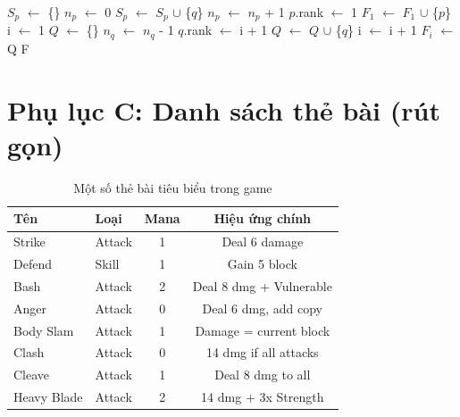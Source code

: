 \begin{algorithm}[H]
\caption{Fast Non-Dominated Sort}
\begin{algorithmic}[1]
    \State $S_p$ $\gets$ \{\} 
    \State $n_p$ $\gets$ 0 
            \State $S_p$ $\gets$ $S_p$ $\cup$ \{$q$\}
            \State $n_p$ $\gets$ $n_p$ + 1
        \EndIf
    \EndFor
        \State $p$.rank $\gets$ 1
        \State $F_1$ $\gets$ $F_1$ $\cup$ \{$p$\}
    \EndIf
\EndFor
\State i $\gets$ 1
    \State $Q$ $\gets$ \{\}
            \State $n_q$ $\gets$ $n_q$ - 1
                \State $q$.rank $\gets$ i + 1
                \State $Q$ $\gets$ $Q$ $\cup$ \{$q$\}
            \EndIf
        \EndFor
    \EndFor
    \State i $\gets$ i + 1
    \State $F_i$ $\gets$ Q
\EndWhile
\State \Return F
\end{algorithmic}
\end{algorithm}

\section*{Phụ lục C: Danh sách thẻ bài (rút gọn)}

\begin{table}[H]
    \centering
    \caption{Một số thẻ bài tiêu biểu trong game}
    \begin{tabular}{l l c c}
        \toprule
        \textbf{Tên} & \textbf{Loại} & \textbf{Mana} & \textbf{Hiệu ứng chính} \\
        \midrule
        Strike & Attack & 1 & Deal 6 damage \\
        Defend & Skill & 1 & Gain 5 block \\
        Bash & Attack & 2 & Deal 8 dmg + Vulnerable \\
        Anger & Attack & 0 & Deal 6 dmg, add copy \\
        Body Slam & Attack & 1 & Damage = current block \\
        Clash & Attack & 0 & 14 dmg if all attacks \\
        Cleave & Attack & 1 & Deal 8 dmg to all \\
        Heavy Blade & Attack & 2 & 14 dmg + 3x Strength \\
        \bottomrule
    \end{tabular}
\end{table}

